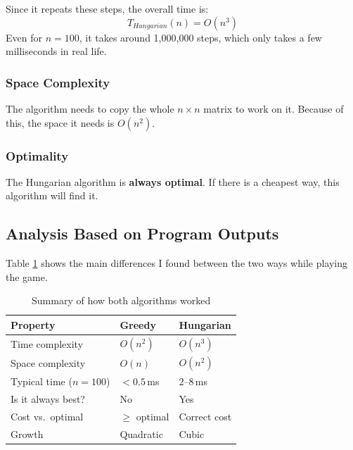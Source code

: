 \documentclass[12pt,a4paper]{article}
\begin{document}
Since it repeats these steps, the overall time is:
\[
    T_{Hungarian}(n) = O(n^3)
\]
Even for $n = 100$, it takes around 1,000,000 steps, which only takes 
a few milliseconds in real life.

\subsubsection{Space Complexity}

The algorithm needs to copy the whole $n \times n$ matrix to work on it. 
Because of this, the space it needs is $O(n^2)$.

\subsubsection{Optimality}

The Hungarian algorithm is \textbf{always optimal}. If there is a cheapest way, 
this algorithm will find it.

\subsection{Analysis Based on Program Outputs}

Table \ref{tab:complexity} shows the main differences I found between the two 
ways while playing the game.

\begin{table}[H]
    \centering
    \caption{Summary of how both algorithms worked}
    \label{tab:complexity}
    \begin{tabularx}{\linewidth}{lXX}
        \toprule
        \textbf{Property}          & \textbf{Greedy}      & \textbf{Hungarian}   \\
        \midrule
        Time complexity            & $O(n^2)$             & $O(n^3)$             \\
        Space complexity           & $O(n)$               & $O(n^2)$             \\
        Typical time ($n=100$)     & $< 0.5$\,ms          & $2$--$8$\,ms         \\
        Is it always best?         & No                   & Yes                  \\
        Cost vs.\ optimal          & $\geq$ optimal       & Correct cost         \\
        Growth                     & Quadratic            & Cubic                \\
        \bottomrule
    \end{tabularx}
\end{table}
\end{document}
